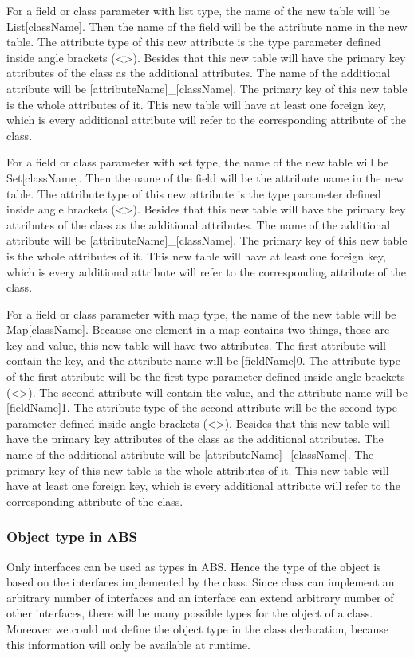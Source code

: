 \documentclass[runningheads,a4paper]{llncs}
\begin{document}
For a field or class parameter with list type, the name of the new table will be List[className]. Then the name of the field will be the attribute name in the new table. The attribute type of this new attribute is the type parameter defined inside angle brackets (\textless \textgreater). Besides that this new table will have the primary key attributes of the class as the additional attributes. The name of the additional attribute will be [attributeName]\_[className]. The primary key of this new table is the whole attributes of it. This new table will have at least one foreign key, which is every additional attribute will refer to the corresponding attribute of the class. 

For a field or class parameter with set type, the name of the new table will be Set[className]. Then the name of the field will be the attribute name in the new table. The attribute type of this new attribute is the type parameter defined inside angle brackets (\textless \textgreater). Besides that this new table will have the primary key attributes of the class as the additional attributes. The name of the additional attribute will be [attributeName]\_[className]. The primary key of this new table is the whole attributes of it. This new table will have at least one foreign key, which is every additional attribute will refer to the corresponding attribute of the class.

For a field or class parameter with map type, the name of the new table will be Map[className]. Because one element in a map contains two things, those are key and value, this new table will have two attributes. The first attribute will contain the key, and the attribute name will be [fieldName]0. The attribute type of the first attribute will be the first type parameter defined inside angle brackets (\textless \textgreater). The second attribute will contain the value, and the attribute name will be [fieldName]1. The attribute type of the second attribute will be the second type parameter defined inside angle brackets (\textless \textgreater). Besides that this new table will have the primary key attributes of the class as the additional attributes. The name of the additional attribute will be [attributeName]\_[className]. The primary key of this new table is the whole attributes of it. This new table will have at least one foreign key, which is every additional attribute will refer to the corresponding attribute of the class.

\subsubsection{Object type in ABS}
Only interfaces can be used as types in ABS. Hence the type of the object is based on the interfaces implemented by the class. Since class can implement an arbitrary number of interfaces and an interface can extend arbitrary number of other interfaces, there will be many possible types for the object of a class. Moreover we could not define the object type in the class declaration, because this information will only be available at runtime.
\end{document}
